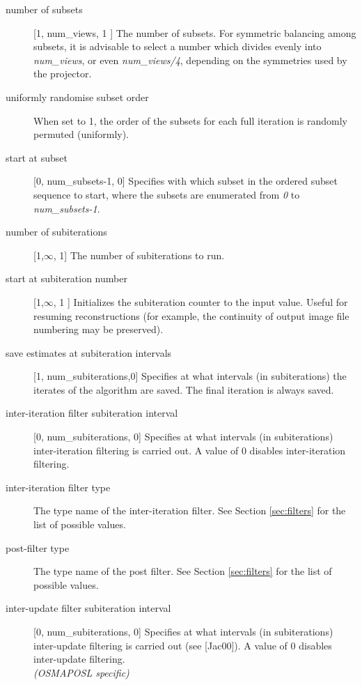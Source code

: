 \documentclass{article}
\begin{document}
{\begin{description}
\item[number of subsets] [1, num\_views, 1 {]}
The number of subsets. For symmetric balancing among subsets, 
it is advisable to select a number which divides evenly into \textit{num\_views},
or even \textit{num\_views/4}, depending on the symmetries used by the projector.


\item[uniformly randomise subset order]
When set to 1, the order of the subsets for each full iteration 
is randomly permuted (uniformly).


\item[start at subset] [0, num\_subsets-1, 0{]}
Specifies with which subset in the ordered subset sequence to 
start, where the subsets are enumerated from \textit{0} to \textit{num\_subsets-1}. 

\item[number of subiterations] [1,\ensuremath{\infty}, 1{]}
The number of subiterations to run.


\item[start at subiteration number] [1,\ensuremath{\infty}, 1 {]}
Initializes the subiteration counter to the input value. Useful 
for resuming reconstructions (for example, the continuity of 
output image file numbering may be preserved).


\item[save estimates at subiteration intervals] [1, num\_subiterations,0{]} 
Specifies at what intervals (in subiterations) the iterates of 
the algorithm are saved. The final iteration is always saved.



\item[inter-iteration filter subiteration interval] [0, num\_subiterations, 0{]}
Specifies at what intervals (in subiterations) inter-iteration 
filtering is carried out. A value of 0 disables inter-iteration 
filtering.


\item[inter-iteration filter type]
The type name of the inter-iteration filter. See Section \ref{sec:filters}
for the list of possible values.

\item[post-filter type]
The type name of the post filter. See Section \ref{sec:filters} for the list 
of possible values.


\item[inter-update filter subiteration interval] [0, num\_subiterations, 0{]}
Specifies at what intervals (in subiterations) inter-update filtering 
is carried out (see [Jac00]). A value of 0 disables inter-update filtering.\\
\textit{(OSMAPOSL specific)}


\end{description}}
\end{document}
